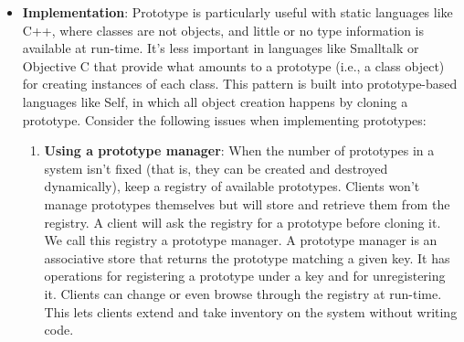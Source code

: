 \documentclass{report}
\begin{document}
\begin{itemize}
\begin{enumerate}
                \item \textbf{Configuring an application with classes dynamically}: Some run-time environments let you load classes into an application dynamically. The Prototype pattern is the key to exploiting such facilities in a language like C++.
                    \bigbreak \noindent 
                    An application that wants to create instances of a dynamically loaded class won't be able to reference its constructor statically. Instead, the run-time environment creates an instance of each class automatically when it's loaded, and it registers the instance with a prototype manager (see the Implementation section). Then the application can ask the prototype manager for instances of newly loaded classes, classes that weren't linked with the program originally.
            \end{enumerate}
            The main liability of the Prototype pattern is that each subclass of Prototype must implement the Clone operation, which may be difficult. For example, adding Clone is difficult when the classes under consideration already exist. Implementing Clone can be difficult when their internals include objects that don't support copying or have circular references.
        \item \textbf{Implementation}: Prototype is particularly useful with static languages like C++, where classes are not objects, and little or no type information is available at run-time. It's less important in languages like Smalltalk or Objective C that provide what amounts to a prototype (i.e., a class object) for creating instances of each class. This pattern is built into prototype-based languages like Self, in which all object creation happens by cloning a prototype.
            \bigbreak \noindent 
            Consider the following issues when implementing prototypes:
            \begin{enumerate}
                \item \textbf{Using a prototype manager}: When the number of prototypes in a system isn't fixed (that is, they can be created and destroyed dynamically), keep a registry of available prototypes. Clients won't manage prototypes themselves but will store and retrieve them from the registry. A client will ask the registry for a prototype before cloning it. We call this registry a prototype manager.
                    \bigbreak \noindent 
                    A prototype manager is an associative store that returns the prototype matching a given key. It has operations for registering a prototype under a key and for unregistering it. Clients can change or even browse through the registry at run-time. This lets clients extend and take inventory on the system without writing code.

\end{enumerate}
\end{itemize}
\end{document}

